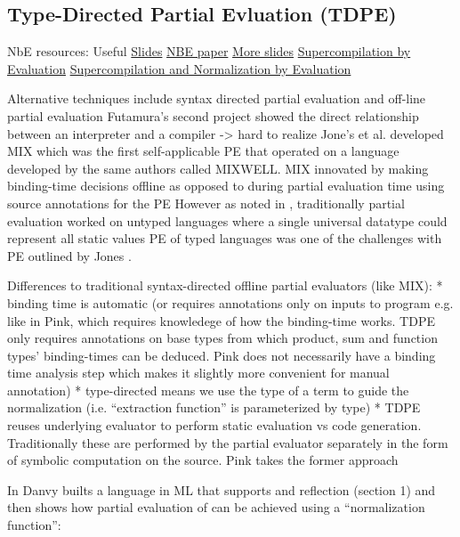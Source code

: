 \documentclass[fleqn]{article}
\theoremstyle{definition}
\begin{document}
\subsection{Type-Directed Partial Evluation (TDPE)}
NbE resources:
Useful \href{http://cs.ioc.ee/ewscs/2009/dybjer/mainPalmse-revised.pdf}{Slides}
\href{http://www.cse.chalmers.se/~abela/univnbe.pdf}{NBE paper}
\href{http://homepages.inf.ed.ac.uk/slindley/nbe/nbe-cambridge2016.pdf}{More slides}
\href{https://www.microsoft.com/en-us/research/wp-content/uploads/2016/07/supercomp-by-eval.pdf?from=http%3A%2F%2Fresearch.microsoft.com%2Fen-us%2Fum%2Fpeople%2Fsimonpj%2Fpapers%2Fsupercompilation%2Fsupercomp-by-eval.pdf}{Supercompilation by Evaluation}
\href{http://citeseerx.ist.psu.edu/viewdoc/download?doi=10.1.1.630.2123&rep=rep1&type=pdf}{Supercompilation and Normalization by Evaluation}

Alternative techniques include syntax directed partial evaluation and off-line partial evaluation
Futamura's second project showed the direct relationship between an interpreter and a compiler -> hard to realize
Jone's et al. developed MIX which was the first self-applicable PE that operated on a language developed by the same authors called MIXWELL.
MIX innovated by making binding-time decisions offline as opposed to during partial evaluation time using source annotations for the PE
However as noted in \cite{grobauer2001second}, traditionally partial evaluation worked on untyped languages where a single universal datatype could represent all static values
PE of typed languages was one of the challenges with PE outlined by Jones \cite{jones1988challenging}.

Differences to traditional syntax-directed offline partial evaluators (like MIX):
* binding time is automatic (or requires annotations only on inputs to program e.g. like in Pink, which requires knowledege of how the binding-time works. TDPE only requires annotations on base types from which product, sum and function types' binding-times can be deduced. Pink does not necessarily have a binding time analysis step which makes it slightly more convenient for manual annotation)
* type-directed means we use the type of a term to guide the normalization (i.e. ``extraction function'' is parameterized by type)
* TDPE reuses underlying evaluator to perform static evaluation vs code generation. Traditionally these are performed by the partial evaluator separately in the form of symbolic computation on the source. Pink takes the former approach

In \cite{danvy1999type} Danvy builts a language in ML that supports and reflection (section 1) and then shows how partial evaluation of can be achieved using a ``normalization function'':
\end{document}

